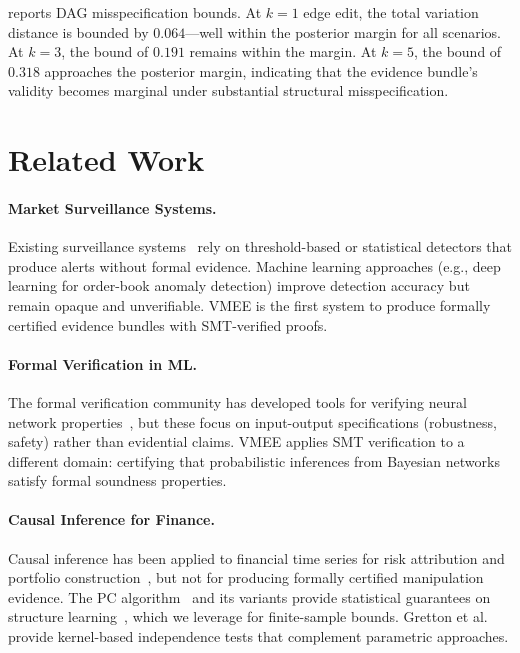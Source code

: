 \documentclass[11pt]{article}
\begin{document}
 reports DAG misspecification bounds.
At $k=1$ edge edit, the total variation distance is bounded by $0.064$---well within the posterior margin for all scenarios.
At $k=3$, the bound of $0.191$ remains within the margin.
At $k=5$, the bound of $0.318$ approaches the posterior margin, indicating that the evidence bundle's validity becomes marginal under substantial structural misspecification.

\section{Related Work}
\label{sec:related}

\paragraph{Market Surveillance Systems.}
Existing surveillance systems~\cite{cont2010,cont2014} rely on threshold-based or statistical detectors that produce alerts without formal evidence.
Machine learning approaches (e.g., deep learning for order-book anomaly detection) improve detection accuracy but remain opaque and unverifiable.
VMEE is the first system to produce formally certified evidence bundles with SMT-verified proofs.

\paragraph{Formal Verification in ML.}
The formal verification community has developed tools for verifying neural network properties~\cite{demoura2008}, but these focus on input-output specifications (robustness, safety) rather than evidential claims.
VMEE applies SMT verification to a different domain: certifying that probabilistic inferences from Bayesian networks satisfy formal soundness properties.

\paragraph{Causal Inference for Finance.}
Causal inference has been applied to financial time series for risk attribution and portfolio construction~\cite{pearl2009,peters2015}, but not for producing formally certified manipulation evidence.
The PC algorithm~\cite{spirtes2000} and its variants provide statistical guarantees on structure learning~\cite{uhler2013}, which we leverage for finite-sample bounds.
Gretton et al.~\cite{gretton2005} provide kernel-based independence tests that complement parametric approaches.
\end{document}
